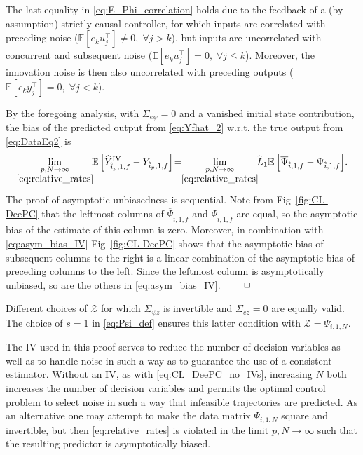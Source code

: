 The last equality in \eqref{eq:E_Phi_correlation} holds due to the feedback of a (by assumption) strictly causal controller, for which inputs are correlated with preceding noise (${\mathbb{E}[e_k u_j^\top]\neq0,\; \forall j>k}$), but inputs are uncorrelated with concurrent and subsequent noise (${\mathbb{E}[e_k u_j^\top]=0,\; \forall j\leq k}$). Moreover, the innovation noise is then also uncorrelated with preceding outputs (${\mathbb{E}[e_k y_j^\top]=0,\; \forall j<k}$).

By the foregoing analysis, with $\Sigma_{e\psi}=0$ and a vanished initial state contribution, the bias of the predicted output from \eqref{eq:Yfhat_2} w.r.t. the true output from \eqref{eq:DataEq2} is
\begin{align}\label{eq:asym_bias_IV}
    \lim_{\underset{\eqref{eq:relative_rates}}{p,N\rightarrow\infty}}\!\!\mathbb{E}\left[\widehat{Y}_{\hat{i}_p,1,f}^\mathrm{IV}-Y_{\hat{i}_p,1,f}\right]\!=\!\!\lim_{\underset{\eqref{eq:relative_rates}}{p,N\rightarrow\infty}}\!\!\widetilde{L}_1\mathbb{E}\left[\overline{\Psi}_{\hat{i},1,f}-\Psi_{\hat{i},1,f}\right]\!.
\end{align}
The proof of asymptotic unbiasedness is sequential. Note from Fig~\ref{fig:CL-DeePC} that the leftmost columns of $\overline{\Psi}_{\hat{i},1,f}$ and $\Psi_{\hat{i},1,f}$ are equal, so the asymptotic bias of the estimate of this column is zero. Moreover, in combination with \eqref{eq:asym_bias_IV} Fig~\ref{fig:CL-DeePC} shows that the asymptotic bias of subsequent columns to the right is a linear combination of the asymptotic bias of preceding columns to the left. Since the leftmost column is asymptotically unbiased, so are the others in \eqref{eq:asym_bias_IV}. $\hfill\qed$
\setcounter{thm}{0}
\begin{rem}
    Different choices of $\mathcal{Z}$ for which $\Sigma_{\psi z}$ is invertible and $\Sigma_{ez}=0$ are equally valid. The choice of $s=1$ in \eqref{eq:Psi_def} ensures this latter condition with $\mathcal{Z}=\Psi_{i,1,N}$.
\end{rem}
\begin{rem}
    The \ac{IV} used in this proof serves to reduce the number of decision variables as well as to handle noise in such a way as to guarantee the use of a consistent estimator. Without an \ac{IV}, as with \eqref{eq:CL_DeePC_no_IVs}, increasing $N$ both increases the number of decision variables and permits the optimal control problem to select noise in such a way that infeasible trajectories are predicted. As an alternative one may attempt to make the data matrix $\Psi_{i,1,N}$ square and invertible, but then \eqref{eq:relative_rates} is violated in the limit $p,N\rightarrow\infty$ such that the resulting predictor is asymptotically biased.
\end{rem}